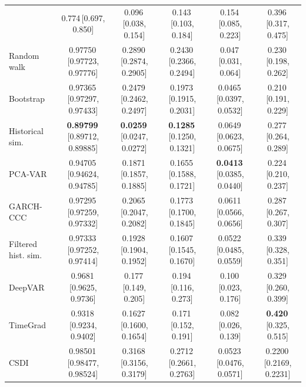 \begin{table}[H]
{\begin{tabular}{@{}lccccc@{}}
\midrule
\scenarioflow{} & 0.774\,[0.697, 0.850] & 0.096\,[0.038, 0.154] & 0.143\,[0.103, 0.184] & 0.154\,[0.085, 0.223] & 0.396\,[0.317, 0.475] \\
Random walk & 0.97750\,[0.97723, 0.97776] & 0.2890\,[0.2874, 0.2905] & 0.2430\,[0.2366, 0.2494] & 0.047\,[0.031, 0.064] & 0.230\,[0.198, 0.262] \\
Bootstrap & 0.97365\,[0.97297, 0.97433] & 0.2479\,[0.2462, 0.2497] & 0.1973\,[0.1915, 0.2031] & 0.0465\,[0.0397, 0.0532] & 0.210\,[0.191, 0.229] \\
Historical sim. & \textbf{0.89799}\,[0.89712, 0.89885] & \textbf{0.0259}\,[0.0247, 0.0272] & \textbf{0.1285}\,[0.1250, 0.1321] & 0.0649\,[0.0623, 0.0675] & 0.277\,[0.264, 0.289] \\
PCA-VAR & 0.94705\,[0.94624, 0.94785] & 0.1871\,[0.1857, 0.1885] & 0.1655\,[0.1588, 0.1721] & \textbf{0.0413}\,[0.0385, 0.0440] & 0.224\,[0.210, 0.237] \\
GARCH-CCC & 0.97295\,[0.97259, 0.97332] & 0.2065\,[0.2047, 0.2082] & 0.1773\,[0.1700, 0.1845] & 0.0611\,[0.0566, 0.0656] & 0.287\,[0.267, 0.307] \\
Filtered hist. sim. & 0.97333\,[0.97252, 0.97414] & 0.1928\,[0.1904, 0.1952] & 0.1607\,[0.1545, 0.1670] & 0.0522\,[0.0485, 0.0559] & 0.339\,[0.328, 0.351] \\
DeepVAR & 0.9681\,[0.9625, 0.9736] & 0.177\,[0.149, 0.205] & 0.194\,[0.116, 0.273] & 0.100\,[0.023, 0.176] & 0.329\,[0.260, 0.399] \\
TimeGrad & 0.9318\,[0.9234, 0.9402] & 0.1627\,[0.1600, 0.1654] & 0.171\,[0.152, 0.191] & 0.082\,[0.026, 0.139] & \textbf{0.420}\,[0.325, 0.515] \\
CSDI & 0.98501\,[0.98477, 0.98524] & 0.3168\,[0.3156, 0.3179] & 0.2712\,[0.2661, 0.2763] & 0.0523\,[0.0476, 0.0571] & 0.2200\,[0.2169, 0.2231] \\
\bottomrule
\end{tabular}%
}
\vspace{3pt}
\end{table}
